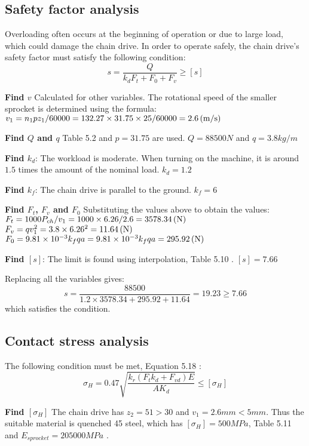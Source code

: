 \subsection{Safety factor analysis}
Overloading often occurs at the beginning of operation or due to large load, which could damage the chain drive. In order to operate safely, the chain drive's safety factor must satisfy the following condition:
\[s = \dfrac{Q}{k_dF_t+F_0+F_v} \geq [s]\]

\textbf{Find $ v $} Calculated for other variables. The rotational speed of the smaller sprocket is determined using the formula: $ v_1={n_1pz_1}/{60000}= {132.27\times 31.75 \times 25}/{60000} = 2.6 \, (\mathrm{m/s}) $

\textbf{Find $ Q $ and $ q $} Table 5.2 \cite{tk1} and $ p =31.75$ are used. $ Q=88500 \unit{N}$ and $ q=3.8\unit{kg/m} $

\textbf{Find $ k_d $}: The workload is moderate. When turning on the machine, it is around $ 1.5 $ times the amount of the nominal load. $ k_d = 1.2 $

\textbf{Find $ k_f $}: The chain drive is parallel to the ground. $ k_f = 6 $

\textbf{Find $ F_t $, $ F_v $ and $ F_0 $} Substituting the values above to obtain the values:\\
$ F_t = {1000P_{ch}}/{v_1} = {1000\times 6.26}/{2.6} = 3578.34 \, (\mathrm{N}) $\\
$ F_v=qv_1^2= 3.8\times 6.26^2 = 11.64 \, (\mathrm{N}) $\\
$ F_0=9.81\times10^{-3}k_fqa = 9.81\times10^{-3}k_fqa = 295.92\, (\mathrm{N})$

\textbf{Find $ [s] $}: The limit is found using interpolation, Table 5.10 \cite{tk1}.  $ [s] =7.66$

Replacing all the variables gives:
\[s=\dfrac{88500}{1.2\times 3578.34+295.92+11.64}=19.23\geq 7.66\]
which satisfies the condition.

\subsection{Contact stress analysis}
The following condition must be met, Equation 5.18 \cite{tk1}:
\[\sigma_H = 0.47\sqrt{\dfrac{k_r(F_tk_d+F_{vd})E}{AK_d}}\leq[\sigma_H]\]

\textbf{Find $ [\sigma_H] $} The chain drive has $ z_2=51>30 $ and $ v_1=2.6\unit{mm}<5 \unit{mm} $. Thus the suitable material is quenched 45 steel, which has $ [\sigma_H] = 500 \unit{MPa} $, Table 5.11 \cite{tk1} and $ E_{sprocket} = 205000 \unit{MPa}$ \cite{Mareau2013ExperimentalAN}.

